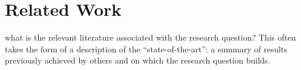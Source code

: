 \section{Related Work}
\label{sec:related_work}
 what is the relevant literature associated with the research question? This
often takes the form of a description of the “state-of-the-art”: a summary of results previously
achieved by others and on which the research question builds.